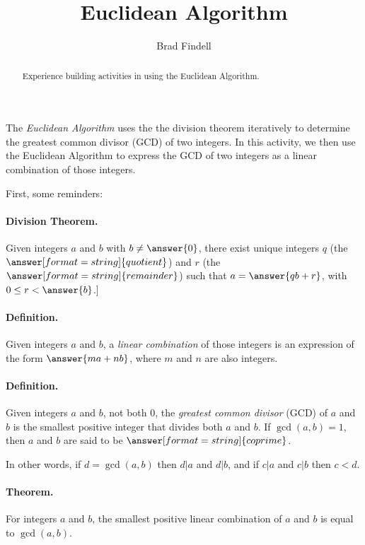\documentclass[space,nooutcomes]{ximera}
\title{Euclidean Algorithm}
\author{Brad Findell}
\begin{document}
\begin{abstract}
Experience building activities in using the Euclidean Algorithm.  
\end{abstract}
\maketitle

The \emph{Euclidean Algorithm} uses the the division theorem iteratively to determine the greatest common divisor (GCD) of two integers.  In this activity, we then use the Euclidean Algorithm to express the GCD of two integers as a linear combination of those integers.  

\begin{problem}
First, some reminders: 

\paragraph{Division Theorem.} Given integers $a$ and $b$ with $b\neq \answer{0}$, there exist unique integers $q$ (the $\answer[format=string]{quotient}$) and $r$ (the $\answer[format=string]{remainder}$) such that $a = \answer{qb + r}$, with $0 \leq r < \answer{b}$.]

\paragraph{Definition.}
Given integers $a$ and $b$, a \emph{linear combination} of those integers is an expression of the form $\answer{ma+nb}$, where $m$ and $n$ are also integers.  

\paragraph{Definition.}
Given integers $a$ and $b$, not both $0$, the \emph{greatest common divisor} (GCD) of $a$ and $b$ is the smallest positive integer that divides both $a$ and $b$. If $\gcd(a,b)=1$, then $a$ and $b$ are said to be $\answer[format=string]{coprime}$.  

In other words, if $d=\gcd(a,b)$ then $d|a$ and $d|b$, and if $c|a$ and $c|b$ then $c<d$.  

\paragraph{Theorem.}
For integers $a$ and $b$, the smallest positive linear combination of $a$ and $b$ is equal to $\gcd(a,b)$.  
\end{problem}
\end{document}
